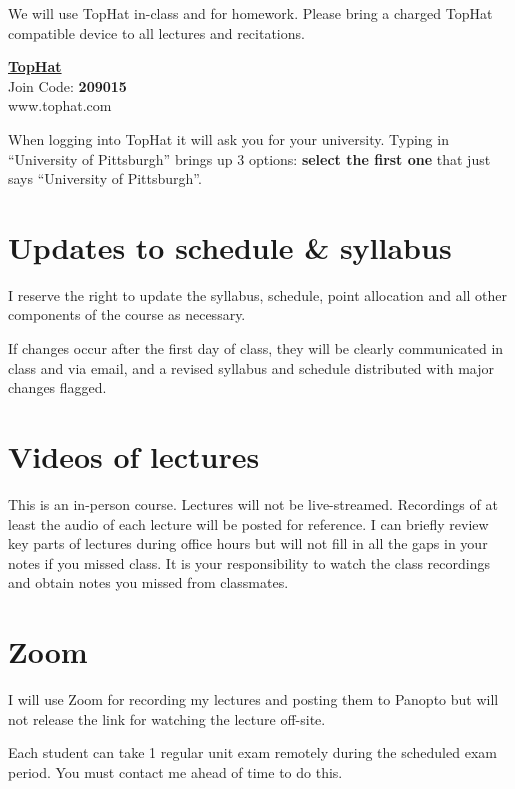 \documentclass[
]{book}
\begin{document}
We will use TopHat in-class and for homework. Please bring a charged TopHat compatible device to all lectures and recitations.

\href{www.tophat.com}{\textbf{TopHat}}\\
Join Code: \textbf{209015}\\
www.tophat.com

When logging into TopHat it will ask you for your university. Typing in ``University of Pittsburgh'' brings up 3 options: \textbf{select the first one} that just says ``University of Pittsburgh''.

\hypertarget{updates-to-schedule-syllabus}{%
\chapter{Updates to schedule \& syllabus}\label{updates-to-schedule-syllabus}}

I reserve the right to update the syllabus, schedule, point allocation and all other components of the course as necessary.

If changes occur after the first day of class, they will be clearly communicated in class and via email, and a revised syllabus and schedule distributed with major changes flagged.

\hypertarget{videos-of-lectures}{%
\chapter{Videos of lectures}\label{videos-of-lectures}}

This is an in-person course. Lectures will not be live-streamed. Recordings of at least the audio of each lecture will be posted for reference. I can briefly review key parts of lectures during office hours but will not fill in all the gaps in your notes if you missed class. It is your responsibility to watch the class recordings and obtain notes you missed from classmates.

\hypertarget{zoom}{%
\chapter{Zoom}\label{zoom}}

I will use Zoom for recording my lectures and posting them to Panopto but will not release the link for watching the lecture off-site.

Each student can take 1 regular unit exam remotely during the scheduled exam period. You must contact me ahead of time to do this.
\end{document}
